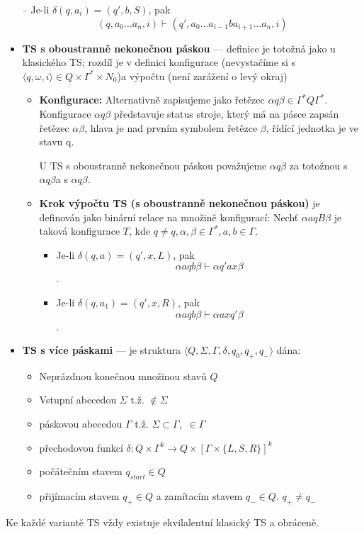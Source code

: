\documentclass[10pt,a4paper]{article}
\theoremstyle{note}
\begin{document}
\begin{itemize}
				-- Je-li $\delta(q, a_{i}) = (q', b, S)$, pak
					$$(q,a_{0} \dots a_{n}, i) \vdash (q', a_{0} \dots a_{i-1}ba_{i+1} \dots a_{n},i) $$
			\item \textbf{TS s oboustranně nekonečnou páskou} --- definice je totožná jako u klasického TS; rozdíl je v definici
			 konfigurace (nevystačíme si s $\langle q, \omega, i \rangle \in Q \times \Gamma^{*} \times N_{0}$)a výpočtu
			(není zarážení o levý okraj)
				\begin{itemize}
					\item \textbf{Konfigurace:} Alternativně zapisujeme jako řetězec
					 	$\alpha q\beta \in \Gamma^{*}Q\Gamma^{*}.$
						Konfigurace $\alpha q\beta$ představuje status stroje, který má na pásce zapsán řetězec
						$ \alpha\beta$,
						hlava	je nad prvním symbolem řetězce $\beta$, řídící jednotka je ve stavu q.

						U TS s oboustranně nekonečnou páskou považujeme $\alpha q\beta$ za totožnou s
						$\alpha q\beta$\textvisiblespace a s \textvisiblespace$\alpha q\beta$.
					\item \textbf{Krok výpočtu TS (s oboustranně nekonečnou páskou)} je definován jako binární
						relace na množině konfigurací: Nechť $\alpha aqB\beta$ je taková konfigurace $T$, kde
						$q \neq q, \alpha, \beta \in \Gamma^{*}, a,b \in \Gamma.$
						\begin{itemize}
							\item Je-li $\delta(q,a) = (q', x, L) $, pak  $$\alpha aqb\beta \vdash \alpha q'ax\beta$$.
							\item Je-li $\delta(q,a_{1}) = (q', x, R) $, pak
									$$\alpha aqb\beta \vdash \alpha axq'\beta$$.
						\end{itemize}
				\end{itemize}
					\item \textbf{TS s více páskami} --- je struktura $\langle Q, \Sigma, \Gamma, \delta, q_{0}, q_{+},
						q_{-} \rangle $ dána:
						\begin{itemize}
							\item Neprázdnou konečnou množinou stavů $Q$
							\item Vstupní abecedou  $\Sigma$ t.ž. \textvisiblespace $ \notin \Sigma$
							\item páskovou abecedou $\Gamma$ t.ž. $\Sigma \subset \Gamma,$ \textvisiblespace
								$\in  \Gamma $
							\item přechodovou funkcí $\delta : Q \times  \Gamma^{k} \rightarrow Q \times [ \Gamma
								\times \{L, S, R \} ]^{k}$
							\item počátečním stavem $q_{start} \in Q$
							\item přijímacím stavem $q_{+} \in Q $ a zamítacím stavem $q_{-}
								\in Q.$ $q_{+} \neq q_{-}$
						\end{itemize}

		\end{itemize}
		Ke každé variantě TS vždy existuje ekvilalentní klasický TS a obráceně.
\end{document}
